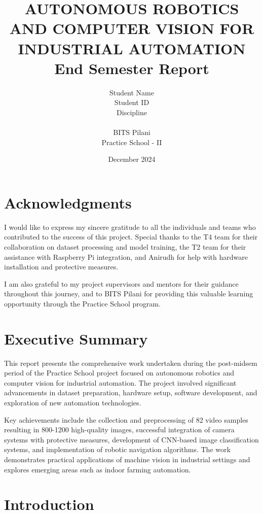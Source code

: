 \documentclass[12pt]{article}
\title{AUTONOMOUS ROBOTICS AND COMPUTER VISION FOR INDUSTRIAL AUTOMATION\\
\large End Semester Report}
\author{Student Name\\
Student ID\\
Discipline\\
\\
BITS Pilani\\
Practice School - II}
\date{December 2024}
\begin{document}
\maketitle

\newpage

\tableofcontents

\newpage

\section{Acknowledgments}

I would like to express my sincere gratitude to all the individuals and teams who contributed to the success of this project. Special thanks to the T4 team for their collaboration on dataset processing and model training, the T2 team for their assistance with Raspberry Pi integration, and Anirudh for help with hardware installation and protective measures.

I am also grateful to my project supervisors and mentors for their guidance throughout this journey, and to BITS Pilani for providing this valuable learning opportunity through the Practice School program.

\newpage

\section{Executive Summary}

This report presents the comprehensive work undertaken during the post-midsem period of the Practice School project focused on autonomous robotics and computer vision for industrial automation. The project involved significant advancements in dataset preparation, hardware setup, software development, and exploration of new automation technologies.

Key achievements include the collection and preprocessing of 82 video samples resulting in 800-1200 high-quality images, successful integration of camera systems with protective measures, development of CNN-based image classification systems, and implementation of robotic navigation algorithms. The work demonstrates practical applications of machine vision in industrial settings and explores emerging areas such as indoor farming automation.

\newpage

\section{Introduction}
\end{document}
